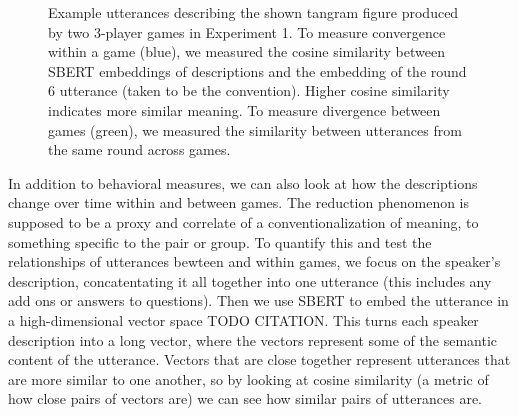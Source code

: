 \documentclass[
  english,
  a4paper,
]{article}
\begin{document}
\begin{figure}
\label{sbert-diagram}
\caption{Example utterances describing the shown tangram figure produced by two 3-player games in Experiment 1. To measure convergence within a game (blue), we measured the cosine similarity between SBERT embeddings of descriptions and the embedding of the round 6 utterance (taken to be the convention). Higher cosine similarity indicates more similar meaning. To measure divergence between games (green), we measured the similarity between utterances from the same round across games.}
\end{figure}

In addition to behavioral measures, we can also look at how the descriptions change over time within and between games. The reduction phenomenon is supposed to be a proxy and correlate of a conventionalization of meaning, to something specific to the pair or group. To quantify this and test the relationships of utterances bewteen and within games, we focus on the speaker's description, concatentating it all together into one utterance (this includes any add ons or answers to questions). Then we use SBERT to embed the utterance in a high-dimensional vector space TODO CITATION. This turns each speaker description into a long vector, where the vectors represent some of the semantic content of the utterance. Vectors that are close together represent utterances that are more similar to one another, so by looking at cosine similarity (a metric of how close pairs of vectors are) we can see how similar pairs of utterances are.
\end{document}
